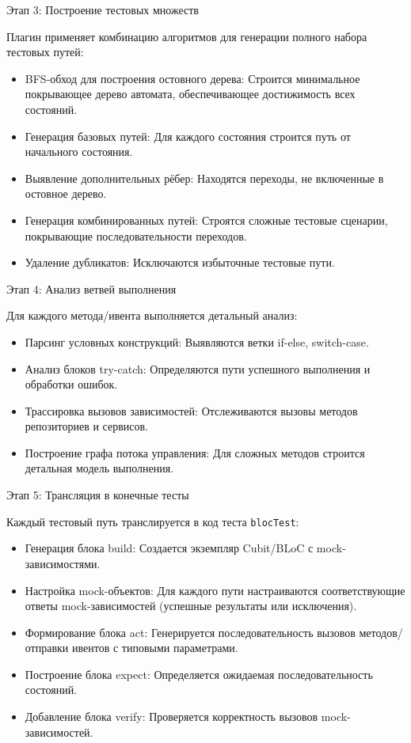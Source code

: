 \documentclass[14pt, russian]{scrartcl}
\begin{document}
Этап 3: Построение тестовых множеств

Плагин применяет комбинацию алгоритмов для генерации полного набора тестовых путей:
\begin{itemize}
    \item BFS-обход для построения остовного дерева: Строится минимальное покрывающее дерево автомата, обеспечивающее достижимость всех состояний.
    \item Генерация базовых путей: Для каждого состояния строится путь от начального состояния.
    \item Выявление дополнительных рёбер: Находятся переходы, не включенные в остовное дерево.
    \item Генерация комбинированных путей: Строятся сложные тестовые сценарии, покрывающие последовательности переходов.
    \item Удаление дубликатов: Исключаются избыточные тестовые пути.
\end{itemize}

Этап 4: Анализ ветвей выполнения

Для каждого метода/ивента выполняется детальный анализ:
\begin{itemize}
    \item Парсинг условных конструкций: Выявляются ветки if-else, switch-case.
    \item Анализ блоков try-catch: Определяются пути успешного выполнения и обработки ошибок.
    \item Трассировка вызовов зависимостей: Отслеживаются вызовы методов репозиториев и сервисов.
    \item Построение графа потока управления: Для сложных методов строится детальная модель выполнения.
\end{itemize}

Этап 5: Трансляция в конечные тесты

Каждый тестовый путь транслируется в код теста \texttt{blocTest}:
\begin{itemize}
    \item Генерация блока build: Создается экземпляр Cubit/BLoC с mock-зависимостями.
    \item Настройка mock-объектов: Для каждого пути настраиваются соответствующие ответы mock-зависимостей (успешные результаты или исключения).
    \item Формирование блока act: Генерируется последовательность вызовов методов/отправки ивентов с типовыми параметрами.
    \item Построение блока expect: Определяется ожидаемая последовательность состояний.
    \item Добавление блока verify: Проверяется корректность вызовов mock-зависимостей.
\end{itemize}
\end{document}
